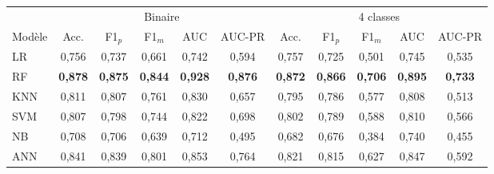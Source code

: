 \begin{tabular}{lcccccccccc}
\toprule
& \multicolumn{5}{c}{Binaire} & \multicolumn{5}{c}{4 classes} \\ \cmidrule(lr){2-6}\cmidrule(lr){7-11}
Modèle & Acc. & F1$_p$ & F1$_m$ & AUC & AUC-PR & Acc. & F1$_p$ & F1$_m$ & AUC & AUC-PR \\
\midrule
LR & 0,756 & 0,737 & 0,661 & 0,742 & 0,594 & 0,757 & 0,725 & 0,501 & 0,745 & 0,535 \\
RF & \textbf{0,878} & \textbf{0,875} & \textbf{0,844} & \textbf{0,928} & \textbf{0,876} & \textbf{0,872} & \textbf{0,866} & \textbf{0,706} & \textbf{0,895} & \textbf{0,733} \\
KNN & 0,811 & 0,807 & 0,761 & 0,830 & 0,657 & 0,795 & 0,786 & 0,577 & 0,808 & 0,513 \\
SVM & 0,807 & 0,798 & 0,744 & 0,822 & 0,698 & 0,802 & 0,789 & 0,588 & 0,810 & 0,566 \\
NB & 0,708 & 0,706 & 0,639 & 0,712 & 0,495 & 0,682 & 0,676 & 0,384 & 0,740 & 0,455 \\
ANN & 0,841 & 0,839 & 0,801 & 0,853 & 0,764 & 0,821 & 0,815 & 0,627 & 0,847 & 0,592 \\
\bottomrule
\end{tabular}